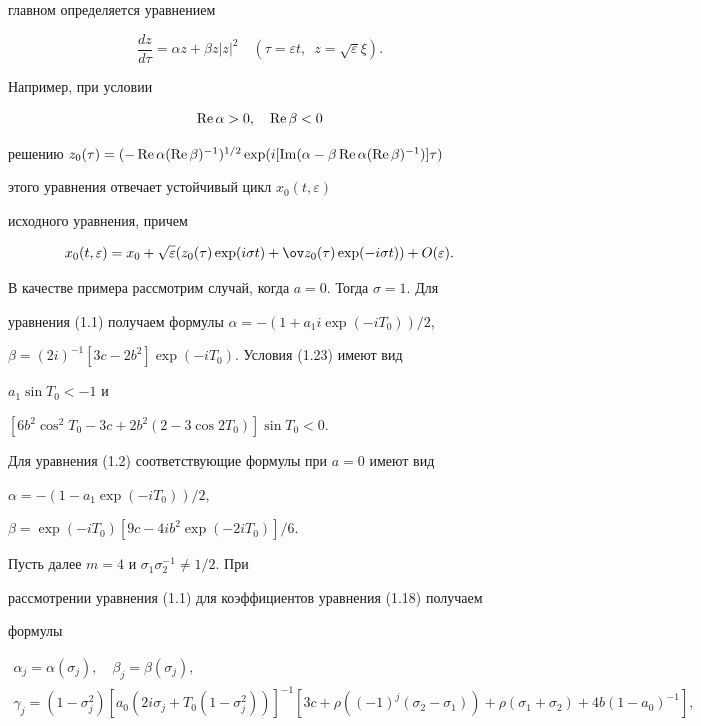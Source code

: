 главном определяется уравнением


$$


\frac{dz}{d\tau} = \alpha z + \beta z|z|^2 \quad


(\tau = \varepsilon t, \ \; z = \sqrt\varepsilon\xi).


$$


Например, при условии


\begin{equation}


\re\alpha > 0, \quad \re\beta < 0


\end{equation}


решению $z_0(\tau)=(-\re\alpha(\re\beta)^{-1})^{1/2}


\exp(i[\im(\alpha-\beta\re\alpha(\re\beta)^{-1})]\tau)$


этого уравнения отвечает устойчивый цикл $x_0(t,\varepsilon)$


исходного уравнения, причем


$$


x_0(t,\varepsilon) = x_0 + \sqrt\varepsilon(z_0(\tau)\exp(i\sigma t) +


\ov z_0(\tau)\exp(-i\sigma t)) + O(\varepsilon).


$$


В качестве примера рассмотрим случай, когда $a=0$. Тогда $\sigma = 1$. Для


уравнения (1.1) получаем формулы $\alpha=-(1+a_1i\exp(-iT_0))/2$,


$\beta=(2i)^{-1}[3c-2b^2]\exp(-iT_0).$ Условия (1.23) имеют вид


$a_1\sin T_0 < -1$ и


$[6b^2\cos^2T_0-3c+2b^2(2-3\cos2T_0)]\sin T_0 < 0$.





Для уравнения (1.2) соответствующие формулы при $a=0$ имеют вид


$\alpha=-(1-a_1\exp(-iT_0))/2$,


$\beta=\exp(-iT_0)[9c- 4 ib^2\exp(-2iT_0)]/6$.





Пусть далее $m=4$ и $\sigma_1 \sigma_2^{-1}\neq 1/2$. При


рассмотрении уравнения (1.1) для коэффициентов уравнения (1.18) получаем


формулы


\begin{gather*}


\alpha_j=\alpha(\sigma_j), \quad \beta_j = \beta(\sigma_j),\\


\gamma_j=(1-\sigma_j^2)[a_0


(2i\sigma_j+T_0(1-\sigma^2_j))]^{-1}


[3c+\rho((-1)^j(\sigma_2-\sigma_1)) +


\rho(\sigma_1+\sigma_2)+4b(1-a_0)^{-1}],


\end{gather*}



